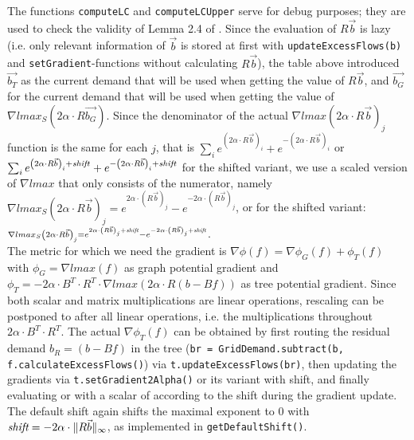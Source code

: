 The functions \texttt{computeLC} and \texttt{computeLCUpper} serve for debug purposes; they are used to check the validity of Lemma 2.4 of \cite{nmfnlt}.
Since the evaluation of $R\vec{b}$ is lazy (i.e. only relevant information of $\vec{b}$ is stored at first with \texttt{updateExcessFlows(b)} and \texttt{setGradient}-functions without calculating $R\vec{b}$), the table above introduced $\vec{b_T}$ as the current demand that will be used when getting the value of $R\vec{b}$, and $\vec{b_G}$ for the current demand that will be used when getting the value of $\nabla lmax_S\left(2\alpha\cdot R\vec{b_G}\right)$. Since the denominator of the actual $\nabla lmax\left(2\alpha\cdot R\vec{b}\right)_j$ function is the same for each $j$, that is $\sum_ie^{\left(2\alpha\cdot R\vec{b}\right)_i}+e^{-\left(2\alpha\cdot R\vec{b}\right)_i}$ or $\sum_ie^{\left(2\alpha\cdot R\vec{b}\right)_i+\text{\emph{shift}}}+e^{-\left(2\alpha\cdot R\vec{b}\right)_i+\text{\emph{shift}}}$ for the shifted variant, we use a scaled version of $\nabla lmax$ that only consists of the numerator, namely $\scriptstyle \nabla lmax_S\left(2\alpha\cdot R\vec{b}\right)_j= e^{2\alpha\cdot \left(R\vec{b}\right)_j}-e^{-2\alpha\cdot \left(R\vec{b}\right)_j}$, or for the shifted variant: $\scriptstyle \nabla lmax_S\left(2\alpha\cdot R\vec{b}\right)_j= e^{2\alpha\cdot \left(R\vec{b}\right)_j+\emph{shift}}-e^{-2\alpha\cdot \left(R\vec{b}\right)_j+\emph{shift}}$.\\
The metric for which we need the gradient is $\nabla \phi(f)=\nabla \phi_G(f)+\phi_T(f)$ with $\phi_G=\nabla lmax(f)$ as graph potential gradient and $\phi_T=-2\alpha\cdot B^T\cdot R^T\cdot \nabla lmax\left(2\alpha\cdot R(b-Bf)\right)$ as tree potential gradient. Since both scalar and matrix multiplications are linear operations, rescaling can be postponed to after all linear operations, i.e. the multiplications throughout $2\alpha\cdot B^T\cdot R^T$. The actual $\nabla \phi_T(f)$ can be obtained by first routing the residual demand $b_R=(b-Bf)$ in the tree (\texttt{br = GridDemand.subtract(b, f.calculateExcessFlows()}) via \texttt{t.updateExcessFlows(br)}, then updating the gradients via \texttt{t.setGradient2Alpha()} or its variant with shift, and finally evaluating \texttt{} or with a scalar of \texttt{} according to the shift during the gradient update. The default shift again shifts the maximal exponent to $0$ with $\emph{shift}=-2\alpha\cdot \Vert R\vec{b}\Vert_\infty$, as implemented in \texttt{getDefaultShift()}.\\
